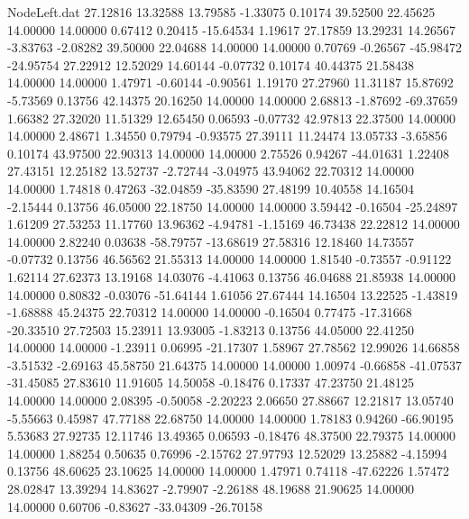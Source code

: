 \begin{filecontents}{NodeLeft.dat}
  27.12816   13.32588   13.79585    -1.33075    0.10174   39.52500   22.45625   14.00000   14.00000    0.67412    0.20415  -15.64534    1.19617
  27.17859   13.29231   14.26567    -3.83763   -2.08282   39.50000   22.04688   14.00000   14.00000    0.70769   -0.26567  -45.98472  -24.95754
  27.22912   12.52029   14.60144    -0.07732    0.10174   40.44375   21.58438   14.00000   14.00000    1.47971   -0.60144   -0.90561    1.19170
  27.27960   11.31187   15.87692    -5.73569    0.13756   42.14375   20.16250   14.00000   14.00000    2.68813   -1.87692  -69.37659    1.66382
  27.32020   11.51329   12.65450     0.06593   -0.07732   42.97813   22.37500   14.00000   14.00000    2.48671    1.34550    0.79794   -0.93575
  27.39111   11.24474   13.05733    -3.65856    0.10174   43.97500   22.90313   14.00000   14.00000    2.75526    0.94267  -44.01631    1.22408
  27.43151   12.25182   13.52737    -2.72744   -3.04975   43.94062   22.70312   14.00000   14.00000    1.74818    0.47263  -32.04859  -35.83590
  27.48199   10.40558   14.16504    -2.15444    0.13756   46.05000   22.18750   14.00000   14.00000    3.59442   -0.16504  -25.24897    1.61209
  27.53253   11.17760   13.96362    -4.94781   -1.15169   46.73438   22.22812   14.00000   14.00000    2.82240    0.03638  -58.79757  -13.68619
  27.58316   12.18460   14.73557    -0.07732    0.13756   46.56562   21.55313   14.00000   14.00000    1.81540   -0.73557   -0.91122    1.62114
  27.62373   13.19168   14.03076    -4.41063    0.13756   46.04688   21.85938   14.00000   14.00000    0.80832   -0.03076  -51.64144    1.61056
  27.67444   14.16504   13.22525    -1.43819   -1.68888   45.24375   22.70312   14.00000   14.00000   -0.16504    0.77475  -17.31668  -20.33510
  27.72503   15.23911   13.93005    -1.83213    0.13756   44.05000   22.41250   14.00000   14.00000   -1.23911    0.06995  -21.17307    1.58967
  27.78562   12.99026   14.66858    -3.51532   -2.69163   45.58750   21.64375   14.00000   14.00000    1.00974   -0.66858  -41.07537  -31.45085
  27.83610   11.91605   14.50058    -0.18476    0.17337   47.23750   21.48125   14.00000   14.00000    2.08395   -0.50058   -2.20223    2.06650
  27.88667   12.21817   13.05740    -5.55663    0.45987   47.77188   22.68750   14.00000   14.00000    1.78183    0.94260  -66.90195    5.53683
  27.92735   12.11746   13.49365     0.06593   -0.18476   48.37500   22.79375   14.00000   14.00000    1.88254    0.50635    0.76996   -2.15762
  27.97793   12.52029   13.25882    -4.15994    0.13756   48.60625   23.10625   14.00000   14.00000    1.47971    0.74118  -47.62226    1.57472
  28.02847   13.39294   14.83627    -2.79907   -2.26188   48.19688   21.90625   14.00000   14.00000    0.60706   -0.83627  -33.04309  -26.70158

\end{filecontents}
